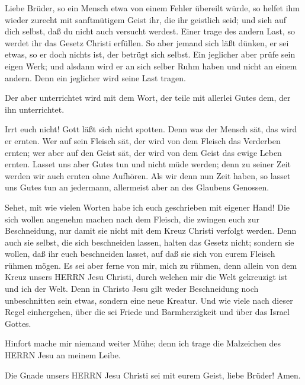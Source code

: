  Liebe Brüder, so ein Mensch etwa von einem Fehler übereilt
würde, so helfet ihm wieder zurecht mit sanftmütigem Geist ihr, die ihr
geistlich seid; und sieh auf dich selbst, daß du nicht auch versucht
werdest.  Einer trage des andern Last, so werdet ihr das
Gesetz Christi erfüllen.  So aber jemand sich läßt dünken,
er sei etwas, so er doch nichts ist, der betrügt sich selbst.
 Ein jeglicher aber prüfe sein eigen Werk; und alsdann wird
er an sich selber Ruhm haben und nicht an einem andern. 
Denn ein jeglicher wird seine Last tragen.

 Der aber unterrichtet wird mit dem Wort, der teile mit
allerlei Gutes dem, der ihn unterrichtet.

 Irrt euch nicht! Gott läßt sich nicht spotten. Denn was der
Mensch sät, das wird er ernten.  Wer auf sein Fleisch sät,
der wird von dem Fleisch das Verderben ernten; wer aber auf den Geist
sät, der wird von dem Geist das ewige Leben ernten.  Lasset
uns aber Gutes tun und nicht müde werden; denn zu seiner Zeit werden wir
auch ernten ohne Aufhören.  Als wir denn nun Zeit haben, so
lasset uns Gutes tun an jedermann, allermeist aber an des Glaubens
Genossen.

 Sehet, mit wie vielen Worten habe ich euch geschrieben mit
eigener Hand!  Die sich wollen angenehm machen nach dem
Fleisch, die zwingen euch zur Beschneidung, nur damit sie nicht mit dem
Kreuz Christi verfolgt werden.  Denn auch sie selbst, die
sich beschneiden lassen, halten das Gesetz nicht; sondern sie wollen,
daß ihr euch beschneiden lasset, auf daß sie sich von eurem Fleisch
rühmen mögen.  Es sei aber ferne von mir, mich zu rühmen,
denn allein von dem Kreuz unsers HERRN Jesu Christi, durch welchen mir
die Welt gekreuzigt ist und ich der Welt.  Denn in Christo
Jesu gilt weder Beschneidung noch unbeschnitten sein etwas, sondern eine
neue Kreatur.  Und wie viele nach dieser Regel einhergehen,
über die sei Friede und Barmherzigkeit und über das Israel Gottes.

 Hinfort mache mir niemand weiter Mühe; denn ich trage die
Malzeichen des HERRN Jesu an meinem Leibe.

 Die Gnade unsers HERRN Jesu Christi sei mit eurem Geist,
liebe Brüder! Amen.
